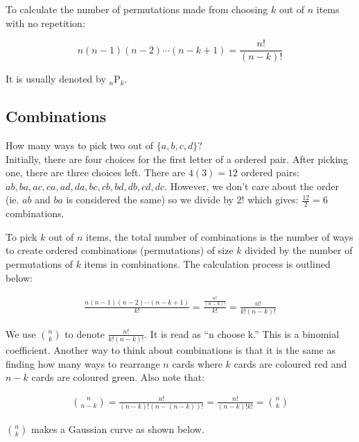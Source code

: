 To calculate the number of permutations made from choosing $k$ out of $n$ items with no repetition:

$$n(n-1)(n-2) \cdots (n-k+1)=\frac{n!}{(n-k)!}$$

It is usually denoted by ${}_n \mathrm{P}_k$.

\subsection{Combinations}

\begin{texample}
	How many ways to pick two out of $\{a, b, c, d\}$? \\
	
	Initially, there are four choices for the first letter of a ordered pair. After picking one, there are three choices left. There are $4(3)=12$ ordered pairs: $ab, ba, ac, ca, ad, da, bc, cb, bd, db, cd, dc$. However, we don't care about the order (ie. $ab$ and $ba$ is considered the same) so we divide by $2!$ which gives: $\frac{12}{2}=6$ combinations.
\end{texample}

To pick $k$ out of $n$ items, the total number of combinations is the number of ways to create ordered combinations (permutations) of size $k$ divided by the number of permutations of $k$ items in combinations. The calculation process is outlined below:

\begin{align*}
	\frac{n(n-1)(n-2) \cdots (n-k+1)}{k!} = \frac{\frac{n!}{(n-k)!}}{k!} = \frac{n!}{k!(n-k)!}
\end{align*}

We use $\binom{n}{k}$ to denote $\frac{n!}{k!(n-k)!}$. It is read as ``n choose k.'' This is a binomial coefficient. Another way to think about combinations is that it is the same as finding how many ways to rearrange $n$ cards where $k$ cards are coloured red and $n-k$ cards are coloured green. Also note that:

\begin{align*}
	\binom{n}{n-k} = \frac{n!}{(n-k)!(n-(n-k))!} = \frac{n!}{(n-k)!k!} = \binom{n}{k}
\end{align*}

$\binom{n}{k}$ makes a Gaussian curve as shown below.

